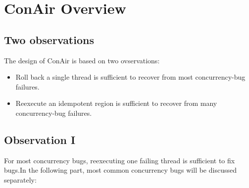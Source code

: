 \chapter{ConAir Overview}
\label{chp:Overview}
\section {Two observations}
The design of ConAir is based on two ovservations:
\begin{itemize}
\item
Roll back a single thread is sufficient to recover from most concurrency-bug failures.
\item
Reexecute an idempotent region is sufficient to recover from many concurrency-bug failures.
\end{itemize}
\section{Observation I}
For most concurrency bugs, reexecuting one failing thread is sufficient to fix bugs.In the following part, most common concurrency bugs will be discussed separately:\\
